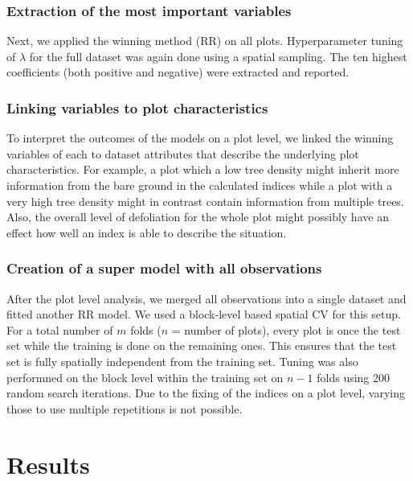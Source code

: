 \documentclass[review]{elsarticle}
\begin{document}
\subsubsection{Extraction of the most important variables}

Next, we applied the winning method (\ac{RR}) on all plots.
Hyperparameter tuning of $\lambda$ for the full dataset was again done using a spatial sampling.
The ten highest coefficients (both positive and negative) were extracted and reported.

\subsubsection{Linking variables to plot characteristics}

To interpret the outcomes of the models on a plot level, we linked the winning variables of each to dataset attributes that describe the underlying plot characteristics.
For example, a plot which a low tree density might inherit more information from the bare ground in the calculated indices while a plot with a very high tree density might in contrast contain information from multiple trees.
Also, the overall level of defoliation for the whole plot might possibly have an effect how well an index is able to describe the situation.

\subsubsection{Creation of a super model with all observations}

After the plot level analysis, we merged all observations into a single dataset and fitted another \ac{RR} model.
We used a block-level based spatial \ac{CV} for this setup.
For a total number of $m$ folds ($n$ = number of plots), every plot is once the test set while the training is done on the remaining ones.
This ensures that the test set is fully spatially independent from the training set.
Tuning was also performned on the block level within the training set on $n - 1$ folds using 200 random search iterations.
Due to the fixing of the indices on a plot level, varying those to use multiple repetitions is not possible.


\section{Results}
\end{document}
